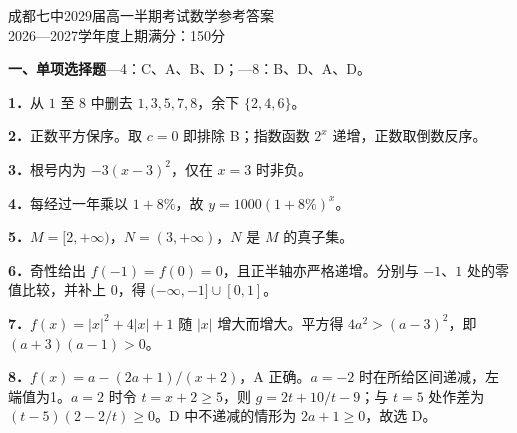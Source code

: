 \documentclass[UTF8,a4paper,12pt]{ctexart}
\newcommand{\q}[1]{\par\textbf{#1．}}
\begin{document}
\begin{center}{\LARGE 成都七中2029届高一半期考试数学参考答案}\\[5pt]2026—2027学年度上期\qquad 满分：150分\end{center}
\textbf{一、单项选择题}—4：C、A、B、D；—8：B、D、A、D。
\q{1}从 $1$ 至 $8$ 中删去 $1,3,5,7,8$，余下 $\{2,4,6\}$。
\q{2}正数平方保序。取 $c=0$ 即排除 B；指数函数 $2^x$ 递增，正数取倒数反序。
\q{3}根号内为 $-3(x-3)^2$，仅在 $x=3$ 时非负。
\q{4}每经过一年乘以 $1+8\%$，故 $y=1000(1+8\%)^x$。
\q{5}$M=[2,+\infty)$，$N=(3,+\infty)$，$N$ 是 $M$ 的真子集。
\q{6}奇性给出 $f(-1)=f(0)=0$，且正半轴亦严格递增。分别与 $-1$、$1$ 处的零值比较，并补上 $0$，得 $(-\infty,-1]\cup[0,1]$。
\q{7}$f(x)=|x|^2+4|x|+1$ 随 $|x|$ 增大而增大。平方得 $4a^2>(a-3)^2$，即 $(a+3)(a-1)>0$。
\q{8}$f(x)=a-(2a+1)/(x+2)$，A 正确。$a=-2$ 时在所给区间递减，左端值为1。$a=2$ 时令 $t=x+2\ge5$，则 $g=2t+10/t-9$；与 $t=5$ 处作差为 $(t-5)(2-2/t)\ge0$。D 中不递减的情形为 $2a+1\ge0$，故选 D。
\end{document}
